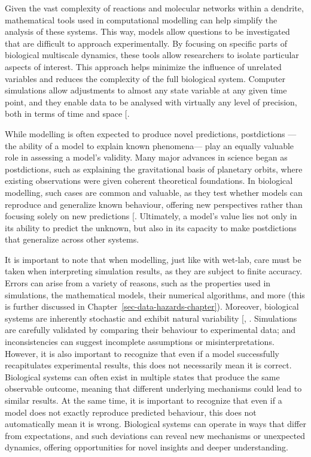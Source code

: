 \documentclass[
  11pt,
  letterpaper,
]{scrreprt}
\begin{document}
Given the vast complexity of reactions and molecular networks within a
dendrite, mathematical tools used in computational modelling can help
simplify the analysis of these systems. This way, models allow questions
to be investigated that are difficult to approach experimentally. By
focusing on specific parts of biological multiscale dynamics, these
tools allow researchers to isolate particular aspects of interest. This
approach helps minimize the influence of unrelated variables and reduces
the complexity of the full biological system. Computer simulations allow
adjustments to almost any state variable at any given time point, and
they enable data to be analysed with virtually any level of precision,
both in terms of time and space
{[}\citeproc{ref-levenstein2023Role}{248}{]}.

While modelling is often expected to produce novel predictions,
postdictions ---the ability of a model to explain known phenomena---
play an equally valuable role in assessing a model's validity. Many
major advances in science began as postdictions, such as explaining the
gravitational basis of planetary orbits, where existing observations
were given coherent theoretical foundations. In biological modelling,
such cases are common and valuable, as they test whether models can
reproduce and generalize known behaviour, offering new perspectives
rather than focusing solely on new predictions
{[}\citeproc{ref-abbott2008Theoretical}{249}{]}. Ultimately, a model's
value lies not only in its ability to predict the unknown, but also in
its capacity to make postdictions that generalize across other systems.

It is important to note that when modelling, just like with wet-lab,
care must be taken when interpreting simulation results, as they are
subject to finite accuracy. Errors can arise from a variety of reasons,
such as the properties used in simulations, the mathematical models,
their numerical algorithms, and more (this is further discussed in
Chapter~\ref{sec-data-hazards-chapter}). Moreover, biological systems
are inherently stochastic and exhibit natural variability
{[},
\citeproc{ref-demopoulos2025Chaos}{251}{]}. Simulations are carefully
validated by comparing their behaviour to experimental data; and
inconsistencies can suggest incomplete assumptions or
misinterpretations. However, it is also important to recognize that even
if a model successfully recapitulates experimental results, this does
not necessarily mean it is correct. Biological systems can often exist
in multiple states that produce the same observable outcome, meaning
that different underlying mechanisms could lead to similar results. At
the same time, it is important to recognize that even if a model does
not exactly reproduce predicted behaviour, this does not automatically
mean it is wrong. Biological systems can operate in ways that differ
from expectations, and such deviations can reveal new mechanisms or
unexpected dynamics, offering opportunities for novel insights and
deeper understanding.
\end{document}
